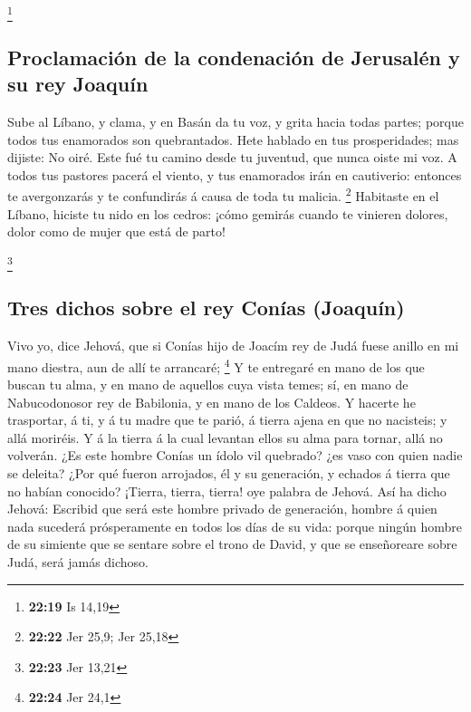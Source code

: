 \footnote{\textbf{22:19} Is 14,19}

\hypertarget{proclamaciuxf3n-de-la-condenaciuxf3n-de-jerusaluxe9n-y-su-rey-joaquuxedn}{%
\subsection{Proclamación de la condenación de Jerusalén y su rey
Joaquín}\label{proclamaciuxf3n-de-la-condenaciuxf3n-de-jerusaluxe9n-y-su-rey-joaquuxedn}}

 Sube al Líbano, y clama, y en Basán da tu voz, y grita
hacia todas partes; porque todos tus enamorados son quebrantados.
 Hete hablado en tus prosperidades; mas dijiste: No oiré.
Este fué tu camino desde tu juventud, que nunca oiste mi voz.
 A todos tus pastores pacerá el viento, y tus enamorados
irán en cautiverio: entonces te avergonzarás y te confundirás á causa de
toda tu malicia. \footnote{\textbf{22:22} Jer 25,9; Jer 25,18}
 Habitaste en el Líbano, hiciste tu nido en los cedros:
¡cómo gemirás cuando te vinieren dolores, dolor como de mujer que está
de parto!

\footnote{\textbf{22:23} Jer 13,21}

\hypertarget{tres-dichos-sobre-el-rey-conuxedas-joaquuxedn}{%
\subsection{Tres dichos sobre el rey Conías
(Joaquín)}\label{tres-dichos-sobre-el-rey-conuxedas-joaquuxedn}}

 Vivo yo, dice Jehová, que si Conías hijo de Joacím rey de
Judá fuese anillo en mi mano diestra, aun de allí te arrancaré;
\footnote{\textbf{22:24} Jer 24,1}  Y te entregaré en mano
de los que buscan tu alma, y en mano de aquellos cuya vista temes; sí,
en mano de Nabucodonosor rey de Babilonia, y en mano de los Caldeos.
 Y hacerte he trasportar, á ti, y á tu madre que te parió,
á tierra ajena en que no nacisteis; y allá moriréis.  Y á
la tierra á la cual levantan ellos su alma para tornar, allá no
volverán.  ¿Es este hombre Conías un ídolo vil quebrado?
¿es vaso con quien nadie se deleita? ¿Por qué fueron arrojados, él y su
generación, y echados á tierra que no habían conocido? 
¡Tierra, tierra, tierra! oye palabra de Jehová.  Así ha
dicho Jehová: Escribid que será este hombre privado de generación,
hombre á quien nada sucederá prósperamente en todos los días de su vida:
porque ningún hombre de su simiente que se sentare sobre el trono de
David, y que se enseñoreare sobre Judá, será jamás dichoso.

